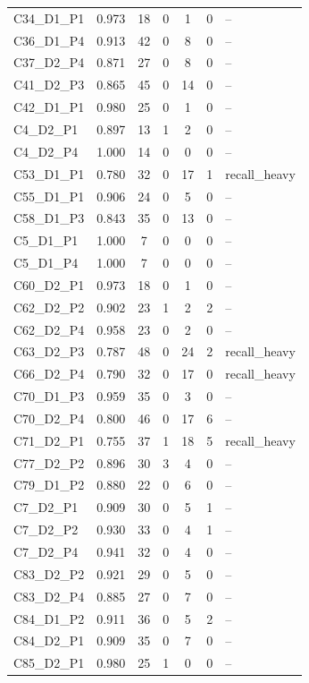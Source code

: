 {\begin{tabular}{p{2.6cm}ccccc p{4.8cm}}
 C34\_D1\_P1 & 0.973 & 18 & 0 & 1 & 0 & -- \\
 C36\_D1\_P4 & 0.913 & 42 & 0 & 8 & 0 & -- \\
 C37\_D2\_P4 & 0.871 & 27 & 0 & 8 & 0 & -- \\
 C41\_D2\_P3 & 0.865 & 45 & 0 & 14 & 0 & -- \\
 C42\_D1\_P1 & 0.980 & 25 & 0 & 1 & 0 & -- \\
 C4\_D2\_P1 & 0.897 & 13 & 1 & 2 & 0 & -- \\
 C4\_D2\_P4 & 1.000 & 14 & 0 & 0 & 0 & -- \\
 C53\_D1\_P1 & 0.780 & 32 & 0 & 17 & 1 & recall\_heavy \\
 C55\_D1\_P1 & 0.906 & 24 & 0 & 5 & 0 & -- \\
 C58\_D1\_P3 & 0.843 & 35 & 0 & 13 & 0 & -- \\
 C5\_D1\_P1 & 1.000 & 7 & 0 & 0 & 0 & -- \\
 C5\_D1\_P4 & 1.000 & 7 & 0 & 0 & 0 & -- \\
 C60\_D2\_P1 & 0.973 & 18 & 0 & 1 & 0 & -- \\
 C62\_D2\_P2 & 0.902 & 23 & 1 & 2 & 2 & -- \\
 C62\_D2\_P4 & 0.958 & 23 & 0 & 2 & 0 & -- \\
 C63\_D2\_P3 & 0.787 & 48 & 0 & 24 & 2 & recall\_heavy \\
 C66\_D2\_P4 & 0.790 & 32 & 0 & 17 & 0 & recall\_heavy \\
 C70\_D1\_P3 & 0.959 & 35 & 0 & 3 & 0 & -- \\
 C70\_D2\_P4 & 0.800 & 46 & 0 & 17 & 6 & -- \\
 C71\_D2\_P1 & 0.755 & 37 & 1 & 18 & 5 & recall\_heavy \\
 C77\_D2\_P2 & 0.896 & 30 & 3 & 4 & 0 & -- \\
 C79\_D1\_P2 & 0.880 & 22 & 0 & 6 & 0 & -- \\
 C7\_D2\_P1 & 0.909 & 30 & 0 & 5 & 1 & -- \\
 C7\_D2\_P2 & 0.930 & 33 & 0 & 4 & 1 & -- \\
 C7\_D2\_P4 & 0.941 & 32 & 0 & 4 & 0 & -- \\
 C83\_D2\_P2 & 0.921 & 29 & 0 & 5 & 0 & -- \\
 C83\_D2\_P4 & 0.885 & 27 & 0 & 7 & 0 & -- \\
 C84\_D1\_P2 & 0.911 & 36 & 0 & 5 & 2 & -- \\
 C84\_D2\_P1 & 0.909 & 35 & 0 & 7 & 0 & -- \\
 C85\_D2\_P1 & 0.980 & 25 & 1 & 0 & 0 & -- \\

\end{tabular}}
